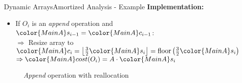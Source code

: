 \begin{frame}{Dynamic Arrays}{Amortized Analysis - Example}
  \textbf{Implementation:}
  \begin{itemize}
    \item
      If {\color{MainA}$O_i$} is an \textit{append} operation and
      ${\color{MainA}s_{i-1}} = {\color{MainA}c_{i-1}}$:\\
      $\Rightarrow$ Resize array to
      ${\color{MainA}c_i}
        = \left\lfloor\frac{3}{2} {\color{MainA}s_i} \right\rfloor
        = \mathrm{floor}\left(\frac{3}{2}{\color{MainA}s_i}\right)$\\
      $\Rightarrow {\color{MainA}cost(O_i)}
        = A \cdot {\color{MainA}s_i}$
  \end{itemize}
  \begin{figure}[!h]
    \def\FSAsize{7}\def\FSAelements{7}%
    \def\FSAcopy{0}\def\FSAdelete{0}\def\FSAinsert{0}%
    \def\FSAcopyarrow{0}%
    \def\FSAlabelsize{${\color{MainA}s_{i-1}} = 7$}%
    \def\FSAlabelcapacity{%
      ${\color{MainA}c_{i-1}}%
        = {\color{MainA}s_{i-1}} = 7$}%
    \hspace*{0.5em}\raisebox{2em}{$\Rightarrow$}\hspace*{0.5em}%
    \def\FSAsize{13}\def\FSAelements{0}%
    \def\FSAcopy{8}\def\FSAdelete{0}\def\FSAinsert{1}%
    \def\FSAlabelsize{${\color{MainA}s_i}
      = {\color{MainA}s_{i-1}} + 1$}%
    \def\FSAlabelcapacity{${\color{MainA}c_i}
      = \frac{3}{2}{\color{MainA}s_i}$ = 13}%
    \caption{\textit{Append} operation with reallocation}
    \label{fig:dynamic_fields:amortized_analysis:append}
  \end{figure}
\end{frame}


